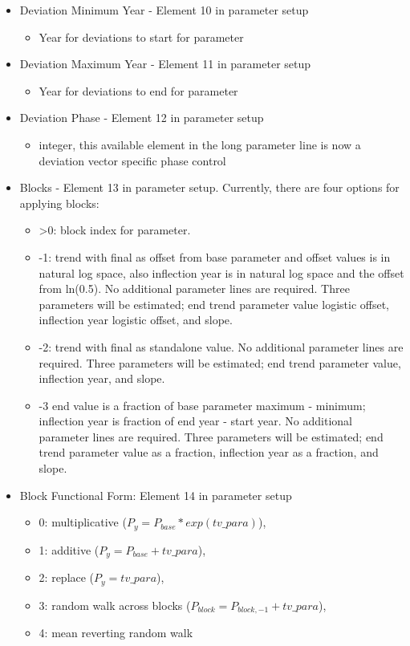 \begin{itemize}
	\item Deviation  Minimum Year - Element 10 in parameter setup
		\begin{itemize}
			\item Year for deviations to start for parameter
		\end{itemize}
		
	\item Deviation  Maximum Year - Element 11 in parameter setup
		\begin{itemize}
			\item Year for deviations to end for parameter
		\end{itemize}
		
	\item Deviation Phase - Element 12 in parameter setup
		\begin{itemize}
			\item integer, this available element in the long parameter line is now a deviation vector specific phase control
		\end{itemize}
		
	\item Blocks - Element 13 in parameter setup. Currently, there are four options for applying blocks:
		\begin{itemize}
			\item >0: block index for parameter.
			\item -1: trend with final as offset from base parameter and offset values is in natural log space, also inflection year is in natural log space and the offset from ln(0.5). No additional parameter lines are required.  Three parameters will be estimated; end trend parameter value logistic offset, inflection year logistic offset, and slope.
			\item -2: trend with final as standalone value. No additional parameter lines are required. Three parameters will be estimated; end trend parameter value, inflection year, and slope.
			\item -3 end value is a fraction of base parameter maximum - minimum; inflection year is fraction of end year - start year. No additional parameter lines are required. Three parameters will be estimated; end trend parameter value as a fraction, inflection year as a fraction, and slope.
		\end{itemize}
		
	\item Block Functional Form: Element 14 in parameter setup
		\begin{itemize}
			\item 0: multiplicative ($P_{y} = P_{base}*exp(tv\_para)$),
			\item 1: additive ($P_{y} = P_{base} + tv\_para$),
			\item 2: replace ($P_{y} = tv\_para$),
			\item 3: random walk across blocks ($P_{block} = P_{block,-1} + tv\_para$),
			\item 4: mean reverting random walk
		\end{itemize}
\end{itemize}


